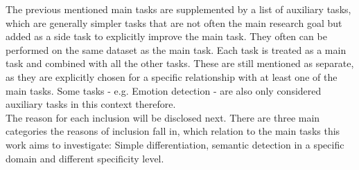 	
	
	The previous mentioned main tasks are supplemented by a list of auxiliary tasks, which are generally simpler tasks that are not often the main research goal but added as a side task to explicitly improve the main task. They often can be performed on the same dataset as the main task. Each task is treated as a main task and combined with all the other tasks. These are still mentioned as separate, as they are explicitly chosen for a specific relationship with at least one of the main tasks. Some tasks - e.g. Emotion detection - are also only considered auxiliary tasks in this context therefore. \\
	
	The reason for each inclusion will be disclosed next. There are three main categories the reasons of inclusion fall in, which relation to the main tasks this work aims to investigate: Simple differentiation, semantic detection in a specific domain and different specificity level. 
	
